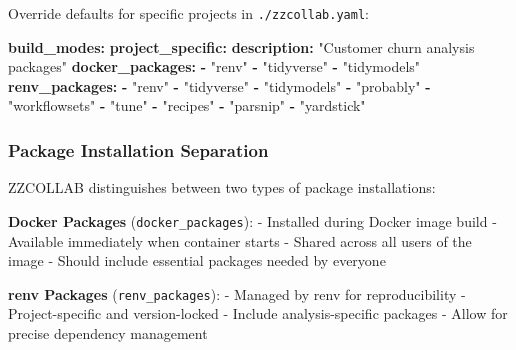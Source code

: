 \documentclass[
]{article}
\newenvironment{Shaded}{\begin{snugshade}}{\end{snugshade}}
\newcommand{\AttributeTok}[1]{\textcolor[rgb]{0.13,0.29,0.53}{#1}}
\newcommand{\FunctionTok}[1]{\textcolor[rgb]{0.13,0.29,0.53}{\textbf{#1}}}
\newcommand{\KeywordTok}[1]{\textcolor[rgb]{0.13,0.29,0.53}{\textbf{#1}}}
\newcommand{\StringTok}[1]{\textcolor[rgb]{0.31,0.60,0.02}{#1}}
\begin{document}
Override defaults for specific projects in \texttt{./zzcollab.yaml}:

\begin{Shaded}
\begin{Highlighting}[]
\FunctionTok{build\_modes}\KeywordTok{:}
\AttributeTok{  }\FunctionTok{project\_specific}\KeywordTok{:}
\AttributeTok{    }\FunctionTok{description}\KeywordTok{:}\AttributeTok{ }\StringTok{"Customer churn analysis packages"}
\AttributeTok{    }\FunctionTok{docker\_packages}\KeywordTok{:}
\AttributeTok{      }\KeywordTok{{-}}\AttributeTok{ }\StringTok{"renv"}
\AttributeTok{      }\KeywordTok{{-}}\AttributeTok{ }\StringTok{"tidyverse"}
\AttributeTok{      }\KeywordTok{{-}}\AttributeTok{ }\StringTok{"tidymodels"}
\AttributeTok{    }\FunctionTok{renv\_packages}\KeywordTok{:}
\AttributeTok{      }\KeywordTok{{-}}\AttributeTok{ }\StringTok{"renv"}
\AttributeTok{      }\KeywordTok{{-}}\AttributeTok{ }\StringTok{"tidyverse"}
\AttributeTok{      }\KeywordTok{{-}}\AttributeTok{ }\StringTok{"tidymodels"}
\AttributeTok{      }\KeywordTok{{-}}\AttributeTok{ }\StringTok{"probably"}
\AttributeTok{      }\KeywordTok{{-}}\AttributeTok{ }\StringTok{"workflowsets"}
\AttributeTok{      }\KeywordTok{{-}}\AttributeTok{ }\StringTok{"tune"}
\AttributeTok{      }\KeywordTok{{-}}\AttributeTok{ }\StringTok{"recipes"}
\AttributeTok{      }\KeywordTok{{-}}\AttributeTok{ }\StringTok{"parsnip"}
\AttributeTok{      }\KeywordTok{{-}}\AttributeTok{ }\StringTok{"yardstick"}
\end{Highlighting}
\end{Shaded}

\subsubsection{Package Installation
Separation}\label{package-installation-separation}

ZZCOLLAB distinguishes between two types of package installations:

\textbf{Docker Packages} (\texttt{docker\_packages}): - Installed during
Docker image build - Available immediately when container starts -
Shared across all users of the image - Should include essential packages
needed by everyone

\textbf{renv Packages} (\texttt{renv\_packages}): - Managed by renv for
reproducibility - Project-specific and version-locked - Include
analysis-specific packages - Allow for precise dependency management
\end{document}
